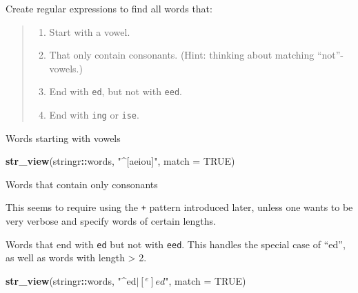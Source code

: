 \documentclass[]{book}
\newenvironment{Shaded}{\begin{snugshade}}{\end{snugshade}}
\newcommand{\DataTypeTok}[1]{\textcolor[rgb]{0.13,0.29,0.53}{#1}}
\newcommand{\KeywordTok}[1]{\textcolor[rgb]{0.13,0.29,0.53}{\textbf{#1}}}
\newcommand{\NormalTok}[1]{#1}
\newcommand{\OperatorTok}[1]{\textcolor[rgb]{0.81,0.36,0.00}{\textbf{#1}}}
\newcommand{\OtherTok}[1]{\textcolor[rgb]{0.56,0.35,0.01}{#1}}
\newcommand{\StringTok}[1]{\textcolor[rgb]{0.31,0.60,0.02}{#1}}
\providecommand{\tightlist}{%
  \setlength{\itemsep}{0pt}\setlength{\parskip}{0pt}}
\theoremstyle{definition}
\theoremstyle{definition}
\theoremstyle{definition}
\theoremstyle{remark}
\begin{document}
Create regular expressions to find all words that:

\begin{quote}
\begin{enumerate}
\def\labelenumi{\arabic{enumi}.}
\tightlist
\item
  Start with a vowel.
\item
  That only contain consonants. (Hint: thinking about matching
  ``not''-vowels.)
\item
  End with \texttt{ed}, but not with \texttt{eed}.
\item
  End with \texttt{ing} or \texttt{ise}.
\end{enumerate}
\end{quote}

Words starting with vowels

\begin{Shaded}
\begin{Highlighting}[]
\KeywordTok{str_view}\NormalTok{(stringr}\OperatorTok{::}\NormalTok{words, }\StringTok{"^[aeiou]"}\NormalTok{, }\DataTypeTok{match =} \OtherTok{TRUE}\NormalTok{)}
\end{Highlighting}
\end{Shaded}

Words that contain only consonants

\begin{Shaded}
\end{Shaded}

This seems to require using the \texttt{+} pattern introduced later,
unless one wants to be very verbose and specify words of certain
lengths.

Words that end with \texttt{ed} but not with \texttt{eed}. This handles
the special case of ``ed'', as well as words with length \textgreater{}
2.

\begin{Shaded}
\begin{Highlighting}[]
\KeywordTok{str_view}\NormalTok{(stringr}\OperatorTok{::}\NormalTok{words, }\StringTok{"^ed$|[^e]ed$"}\NormalTok{, }\DataTypeTok{match =} \OtherTok{TRUE}\NormalTok{)}
\end{Highlighting}
\end{Shaded}
\end{document}
